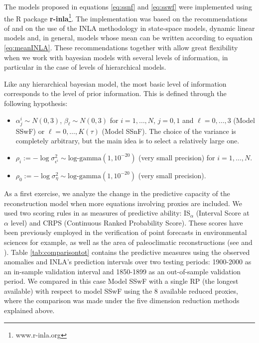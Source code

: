 \documentclass[11pt]{amsart}
\theoremstyle{plain}
\theoremstyle{definition}
\theoremstyle{remark}
\begin{document}
The models proposed in equations \eqref{eq:ssnf} and \eqref{eq:sswf} were
implemented using the R package \textbf{r-inla}\footnote{www.r-inla.org}. The
implementation was based on the recommendations of \cite{Ruiz-Cardenas2012} and
\cite{Muff2015} on the use of the INLA methodology in state-space models,
dynamic linear models and, in general, models whose mean can be written
according to equation \eqref{eq:meanINLA}. These
recommendations together with \cite{Martins2013} allow
great flexibility when we work with bayesian models with several levels of
information, in particular in the case of levels of hierarchical models.

Like any hierarchical bayesian model, the most basic level of information
corresponds to the level of prior information. This is defined through the
following hypothesis:
\begin{itemize}
\item $\alpha^i_j\sim N(0,3)$, $\beta_\ell \sim N(0,3)$ for $i=1,\ldots,N$, $j=0,1$ and $\ell=0,\ldots,3$
  (Model SSwF) or $\ell=0,\ldots,K(\tau)$ (Model SSnF). The choice of the variance is
  completely arbitrary, but the main idea is to select a relatively large one.
  
\item $\rho_i := -\log \sigma^2_{\epsilon^i}\sim \text{log-gamma}(1,10^{-20})$
  (very small precision) for $i=1,\ldots,N$.
  
\item $\rho_0 := -\log \sigma^2_\eta \sim \text{log-gamma}(1,10^{-20})$ (very
  small precision).
\end{itemize}

As a first exercise, we analyze the change in the predictive capacity of the
reconstruction model when more equations involving proxies are included. We used
two scoring rules in \cite{Gneiting2007a} as measures of predictive ability:
IS$_\alpha$ (Interval Score at $\alpha$ level) and CRPS (Continuous Ranked
Probability Score). These scores have been previously employed in the
verification of point forecasts in environmental sciences for example, as well as the area
of paleoclimatic reconstructions (see \cite{Barboza2014} and
\cite{Scheuerer2014}). Table \ref{tab:comparisontot} contains the predictive
measures using the observed anomalies and INLA's prediction intervals over two
testing periods: 1900-2000 as an in-sample validation interval and 1850-1899 as an
out-of-sample validation period. We compared in this case Model SSwF with a single RP
(the longest available) with respect to model SSwF using the 8 available reduced
proxies, where the comparison was made under the five dimension reduction
methods explained above.
\end{document}
